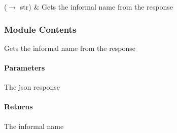 \documentclass[letterpaper,10pt,english]{sphinxmanual}
\begin{document}
\begin{savenotes}\sphinxattablestart
\sphinxthistablewithglobalstyle
\sphinxthistablewithnovlinesstyle
\centering
\begin{tabulary}{\linewidth}[t]{}
\sphinxtoprule
\sphinxtableatstartofbodyhook
\sphinxAtStartPar
{}(\(\rightarrow\) str)
&
\sphinxAtStartPar
Gets the informal name from the response
\\
\sphinxbottomrule
\end{tabulary}
\sphinxtableafterendhook\par
\sphinxattableend\end{savenotes}


\subsubsection{Module Contents}
\label{\detokenize{autoapi/utils/index:module-contents}}

\begin{fulllineitems}
\label{\detokenize{autoapi/utils/index:utils.get_informal_name}}
\pysigstartsignatures
{}
\pysigstopsignatures
\sphinxAtStartPar
Gets the informal name from the response


\paragraph{Parameters}
\label{\detokenize{autoapi/utils/index:parameters}}\begin{description}
\sphinxAtStartPar
The json response

\end{description}


\paragraph{Returns}
\label{\detokenize{autoapi/utils/index:returns}}\begin{description}
\sphinxAtStartPar
The informal name

\end{description}

\end{fulllineitems}
\end{document}
